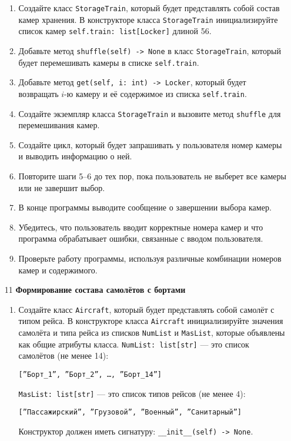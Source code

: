 \begin{enumerate}
\begin{enumerate}
    \item Создайте класс \texttt{StorageTrain}, который будет представлять собой состав камер хранения. В конструкторе класса \texttt{StorageTrain} инициализируйте список камер \texttt{self.train: list[Locker]} длиной 56.

    \item Добавьте метод \texttt{shuffle(self) -> None} в класс \texttt{StorageTrain}, который будет перемешивать камеры в списке \texttt{self.train}.

    \item Добавьте метод \texttt{get(self, i: int) -> Locker}, который будет возвращать $i$-ю камеру и её содержимое из списка \texttt{self.train}.

    \item Создайте экземпляр класса \texttt{StorageTrain} и вызовите метод \texttt{shuffle} для перемешивания камер.

    \item Создайте цикл, который будет запрашивать у пользователя номер камеры и выводить информацию о ней.

    \item Повторите шаги 5–6 до тех пор, пока пользователь не выберет все камеры или не завершит выбор.

    \item В конце программы выводите сообщение о завершении выбора камер.

    \item Убедитесь, что пользователь вводит корректные номера камер и что программа обрабатывает ошибки, связанные с вводом пользователя.

    \item Проверьте работу программы, используя различные комбинации номеров камер и содержимого.
\end{enumerate}

\item[11] \textbf{Формирование состава самолётов с бортами}
\begin{enumerate}
    \item Создайте класс \texttt{Aircraft}, который будет представлять собой самолёт с типом рейса. В конструкторе класса \texttt{Aircraft} инициализируйте значения самолёта и типа рейса из списков \texttt{NumList} и \texttt{MasList}, которые объявлены как общие атрибуты класса. \texttt{NumList: list[str]} — это список самолётов (не менее 14): 
    \begin{center}
        \texttt{[''Борт\_1'', ''Борт\_2'', \dots, ''Борт\_14'']}
    \end{center}
    \texttt{MasList: list[str]} — это список типов рейсов (не менее 4):
    \begin{center}
        \texttt{[''Пассажирский'', ''Грузовой'', ''Военный'', ''Санитарный'']}
    \end{center}
    Конструктор должен иметь сигнатуру: \texttt{\_\_init\_\_(self) -> None}.


\end{enumerate}
\end{enumerate}
